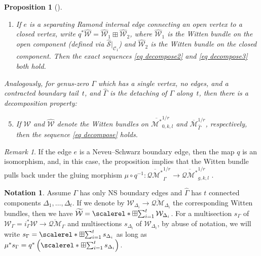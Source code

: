 \documentclass[11pt]{amsart}
\newtheorem{pr}[dummy]{Proposition}
\theoremstyle{definition}
\newtheorem{nn}[dummy]{Notation}
\theoremstyle{remark}
\newtheorem{rmk}[dummy]{Remark}
\newcommand{\oQMb}{{\overline{\mathcal{QM}}}}
\newcommand{\<}{\left<}
\renewcommand{\>}{\right>}
\numberwithin{equation}{section}
\def\Mbar{{\overline{\mathcal M}}}
\def\Mbarstar{{\overline{\mathcal M^*}}}
\DeclareMathOperator*{\bboxplus}{\scalerel*{\boxplus}{\sum}}
\begin{document}
\begin{pr}[{\cite[Proposition 2.20]{TZ1}}]
\begin{enumerate}
\item If %
$e$ is a separating Ramond internal edge connecting an open vertex to a closed vertex, write $q^*\widehat{\mathcal{W}} = \widehat{\mathcal{W}}_1 \boxplus \widehat{\mathcal{W}}_2$, where $\widehat{\mathcal{W}}_1$ is the Witten bundle on the open component (defined via $\widehat{\mathcal{S}}|_{\mathcal{C}_1}$) and $\widehat{\mathcal{W}}_2$ is the Witten bundle on the closed component.  Then the exact sequences \eqref{eq decompose2} and \eqref{eq decompose3} both hold.
\end{enumerate}
Analogously, for genus-zero $\Gamma$ which has a single vertex, no edges, and a contracted boundary tail~$t$, and $\widehat{\Gamma}$ is the detaching of $\Gamma$ along~$t$, then there is a decomposition %
property:
\begin{enumerate}
\setcounter{enumi}{4}
\item\label{it decompose cb tail} If %
${\mathcal{W}}$ and $\widehat{\mathcal{W}}$ denote the Witten bundles on $\Mbarstar_{0,k,l}^{1/r}$ and $\Mbar_{\widehat\Gamma}^{1/r}$, respectively, then the sequence \eqref{eq decompose} holds.
\end{enumerate}
\end{pr}

\begin{rmk}\label{rmk decompose NS boundary node}
If the edge $e$ is a Neveu--Schwarz boundary edge, then the map $q$ is an %
isomorphism, and, in this %
case, the proposition implies that the Witten bundle pulls back under the gluing morphism $\mu\circ q^{-1}\colon\overline{\mathcal{QM}^*}_{\widehat\Gamma}^{1/r} \to \overline{\mathcal{QM}^*}_{g,k,l}^{1/r}$%
.

\end{rmk}

\begin{nn}
    Assume $\Gamma$ %
has only NS boundary edges and $\widehat{\Gamma}$ has $t$ connected components $\Delta_1,\dots, \Delta_t$. If we denote by $\mathcal W_{\Delta_i}\to \oQMb_{\Delta_i}$ the corresponding %
Witten bundles, then we %
have $\widetilde{\mathcal W}=\bboxplus_{i=1}^t \mathcal W_{\Delta_i}$. For a multisection $s_{\Gamma}$ of $\mathcal W_{\Gamma}=i_{\Gamma}^* \mathcal W \to \oQMb_{\Gamma}$ and multisections $s_{\Delta_i}$ of $\mathcal W_{\Delta_i}$, 
    by abuse of notation, we will write 
    $
     s_{\Gamma}=\bboxplus_{i=1}^t s_{\Delta_i}
    $
    as long as
    $
     \mu^*s_{\Gamma}= q^*\left(\bboxplus_{i=1}^t s_{\Delta_i} \right).
    $
\end{nn}
\end{document}

